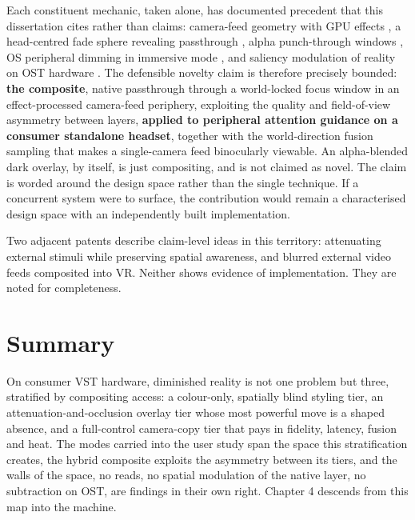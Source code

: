 Each constituent mechanic, taken alone, has documented precedent that this dissertation cites rather
than claims: camera-feed geometry with GPU effects \citep{coviello2025}, a head-centred fade sphere
revealing passthrough \citep{meta2024c}, alpha punch-through windows \citep{meta2024b,immersed2022},
OS peripheral dimming in immersive mode \citep{meta2024d}, and saliency modulation of reality on OST
hardware \citep{sutton2022}. The defensible novelty claim is therefore precisely bounded: \textbf{the
composite}, native passthrough through a world-locked focus window in an effect-processed camera-feed
periphery, exploiting the quality and field-of-view asymmetry between layers, \textbf{applied to
peripheral attention guidance on a consumer standalone headset}, together with the world-direction
fusion sampling that makes a single-camera feed binocularly viewable. An alpha-blended dark overlay, by
itself, is just compositing, and is not claimed as novel. The claim is worded around the design
space rather than the single technique. If a concurrent system were to surface, the contribution
would remain a characterised design space with an independently built implementation.

Two adjacent patents \citep{patents} describe claim-level ideas in this territory: attenuating
external stimuli while preserving spatial awareness, and blurred external video feeds composited into
VR. Neither shows evidence of implementation. They are noted for completeness.

\section{Summary}

On consumer VST hardware, diminished reality is not one problem but three, stratified by compositing
access: a colour-only, spatially blind styling tier, an attenuation-and-occlusion overlay tier whose
most powerful move is a shaped absence, and a full-control camera-copy tier that pays in fidelity,
latency, fusion and heat. The modes carried into the user study span the space this stratification
creates, the hybrid
composite exploits the asymmetry between its tiers, and the walls of the space, no reads, no spatial
modulation of the native layer, no subtraction on OST, are findings in their own right. Chapter 4
descends from this map into the machine.
